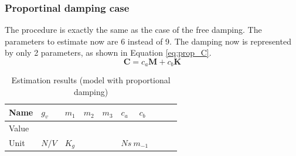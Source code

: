 \documentclass[twosided,a4paper]{article}           %
\begin{document}
\subsubsection{Proportinal damping case}
The procedure is exactly the same as the case of the free damping. The parameters to estimate now are 6 instead of 9. The damping now is represented by only 2 parameters, as shown in Equation \eqref{eq:prop_C}.
\begin{equation}
	\label{eq:prop_C}
	\bm{C} = c_a\bm{M} + c_b\bm{K}
\end{equation}
\begin{table}[H]
	\centering
	\label{tab:est_prop_results}
	\begin{tabular}{|l|l|l|l|l|l|l|l|l|l|}
		\hline
		Name & $g_v$ &  $m_1$ & $m_2$ & $m_3$  &  $c_a$ & $c_b$  \\
		\hline
		Value &  &  &  &  &  &  \\ 
		\hline
		Unit & $N/V$ &  \multicolumn{3}{l|}{$K_g$}  &  \multicolumn{2}{l|}{$Ns \ m_{-1}$} \\
		\hline
	\end{tabular}
	\caption{Estimation results (model with proportional damping)}
\end{table}
\end{document}
